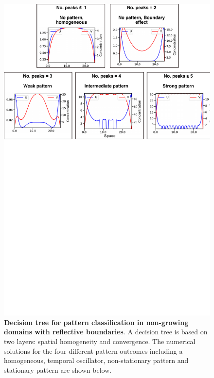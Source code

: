 \begin{figure}[!h]
    \includegraphics[width=1\textwidth]{figures/growth_classification}

    \caption{\textbf{Decision tree for pattern classification in non-growing domains with reflective boundaries}. A decision tree is based on two layers: spatial homogeneity and convergence. The numerical solutions for the four different pattern outcomes including a homogeneous, temporal oscillator, non-stationary pattern and stationary pattern are shown below.}
    \label{sup_fig3}
\end{figure}


